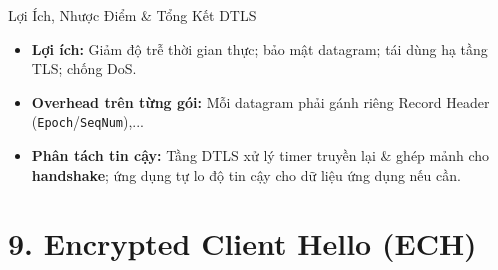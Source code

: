 \documentclass[aspectratio=169, 10pt]{beamer}
\begin{document}
\begin{frame}{Lợi Ích, Nhược Điểm \& Tổng Kết DTLS}
    \raggedright
    \setlength{\leftmargini}{12pt}
    \begin{itemize}
        \setlength{\itemsep}{8pt}
        \small 
        \item[\cmark] \textbf{Lợi ích:} Giảm độ trễ thời gian thực; bảo mật datagram; tái dùng hạ tầng TLS; chống DoS.
        \item[\xmark] \textbf{Overhead trên từng gói:} Mỗi datagram phải gánh riêng Record Header (\texttt{Epoch}/\texttt{SeqNum}),...
        \item[\xmark] \textbf{Phân tách tin cậy:} Tầng DTLS xử lý timer truyền lại \& ghép mảnh cho \textbf{handshake}; ứng dụng tự lo độ tin cậy cho dữ liệu ứng dụng nếu cần.
    \end{itemize}
\end{frame}

\section{9. Encrypted Client Hello (ECH)}
\end{document}
